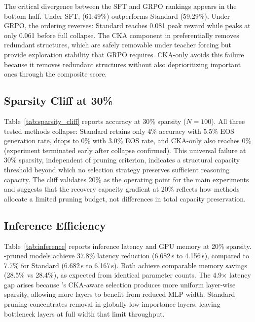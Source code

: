 The critical divergence between the SFT and GRPO rankings appears in the bottom half.
Under SFT, \rasp{} (61.49\%) outperforms Standard (59.29\%).
Under GRPO, the ordering reverses: Standard reaches 0.081 peak reward while \rasp{} peaks at only 0.061 before full collapse.
The CKA component in \rasp{} preferentially removes redundant structures, which are safely removable under teacher forcing but provide exploration stability that GRPO requires.
CKA-only avoids this failure because it removes redundant structures without also deprioritizing important ones through the composite score.


\subsection{Sparsity Cliff at 30\%}
\label{sec:sparsity_cliff}



Table~\ref{tab:sparsity_cliff} reports accuracy at 30\% sparsity ($N{=}100$).
All three tested methods collapse: Standard retains only 4\% accuracy with 5.5\% EOS generation rate, \rasp{} drops to 0\% with 3.0\% EOS rate, and CKA-only also reaches 0\% (experiment terminated early after collapse confirmed).
This universal failure at 30\% sparsity, independent of pruning criterion, indicates a structural capacity threshold beyond which no selection strategy preserves sufficient reasoning capacity.
The cliff validates 20\% as the operating point for the main experiments and suggests that the recovery capacity gradient at 20\% reflects how methods allocate a limited pruning budget, not differences in total capacity preservation.


\subsection{Inference Efficiency}
\label{sec:inference}



Table~\ref{tab:inference} reports inference latency and GPU memory at 20\% sparsity.
\rasp{}-pruned models achieve 37.8\% latency reduction (6.682\,s to 4.156\,s), compared to 7.7\% for Standard (6.682\,s to 6.167\,s).
Both achieve comparable memory savings (28.5\% vs 28.4\%), as expected from identical parameter counts.
The 4.9$\times$ latency gap arises because \rasp{}'s CKA-aware selection produces more uniform layer-wise sparsity, allowing more layers to benefit from reduced MLP width.
Standard pruning concentrates removal in globally low-importance layers, leaving bottleneck layers at full width that limit throughput.


